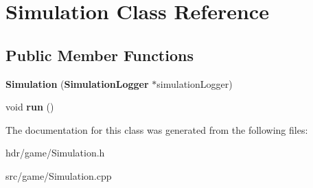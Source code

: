 \section{Simulation Class Reference}
\label{class_simulation}
\subsection*{Public Member Functions}
\begin{DoxyCompactItemize}
\item 
{\bfseries Simulation} ({\bf Simulation\-Logger} $\ast$simulation\-Logger)\label{class_simulation_ac7a66a0b7cca01eaf41e4a1c922ffa42}

\item 
void {\bfseries run} ()\label{class_simulation_ae5c367f87c0b5dc9740bc6d00e44e72c}

\end{DoxyCompactItemize}


The documentation for this class was generated from the following files\-:\begin{DoxyCompactItemize}
\item 
hdr/game/Simulation.\-h\item 
src/game/Simulation.\-cpp\end{DoxyCompactItemize}
